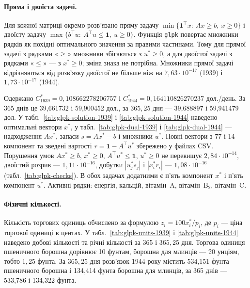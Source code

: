 \paragraph{Пряма і двоїста задачі.}
Для кожної матриці окремо розв’язано пряму задачу $\min\{\mathbf1^\top x:\ Ax\ge b,\ x\ge0\}$ і двоїсту задачу $\max\{b^\top u:\ A^\top u\le\mathbf1,\ u\ge0\}$. Функція \texttt{glpk} повертає множники рядків як похідні оптимального значення за правими частинами. Тому для прямої задачі з рядками «$\ge$» множники збігаються з $u^*\ge0$, а для двоїстої задачі з рядками «$\le$» --- з $x^*\ge0$; зміна знака не потрібна. Множники прямої задачі відрізняються від розв’язку двоїстої не більше ніж на $7{,}63\cdot10^{-17}$ (1939) і $1{,}73\cdot10^{-17}$ (1944).

Одержано $C^*_{1939}=0{,}108662278206757$ і $C^*_{1944}=0{,}164110826270237$ дол./день. За 365 днів це 39{,}661732 і 59{,}900452 дол., за $365{,}25$ дня --- 39{,}688897 і 59{,}941479 дол. У табл.~\ref{tab:glpk-solution-1939} і \ref{tab:glpk-solution-1944} наведено оптимальні вектори $x^*$, у табл.~\ref{tab:glpk-dual-1939} і \ref{tab:glpk-dual-1944} --- надходження $Ax^*$, запаси $s=Ax^*-b$ і множники $u^*$. Повні вектори з 77 і 14 компонент та зведені вартості $r=\mathbf1-A^\top u^*$ збережено у файлах CSV. Порушення умов $Ax^*\ge b$, $x^*\ge0$, $A^\top u^*\le\mathbf1$, $u^*\ge0$ не перевищує $2{,}84\cdot10^{-14}$, двоїстий розрив --- $1{,}11\cdot10^{-16}$, добутки $|u_j^*s_j|$ і $|x_i^*r_i|$ --- $1{,}08\cdot10^{-16}$ (табл.~\ref{tab:glpk-checks}). В обох задачах додатними є п’ять компонент $x^*$ і п’ять компонент $u^*$. Активні рядки: енергія, кальцій, вітамін~A, вітамін~B$_2$, вітамін~C.

\paragraph{Фізичні кількості.}
Кількість торгових одиниць обчислено за формулою $z_i=100x_i^*/p_i$, де $p_i$ --- ціна торгової одиниці в центах. У табл.~\ref{tab:glpk-units-1939} і \ref{tab:glpk-units-1944} наведено добові кількості та річні кількості за 365 і $365{,}25$ дня. Торгова одиниця пшеничного борошна дорівнює 10 фунтам, борошна для млинців --- 20 унціям, тобто $1{,}25$ фунта. За $365{,}25$ дня розв’язок 1944 року містить 534{,}151 фунта пшеничного борошна і 134{,}414 фунта борошна для млинців, за 365 днів --- 533{,}786 і 134{,}322 фунта.

